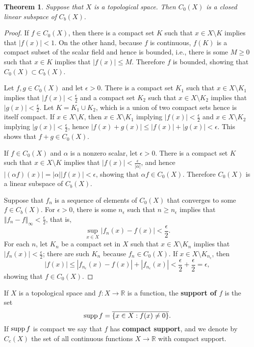 \documentclass{article}
\newcommand{\supp}{\ensuremath\mathrm{supp}\,}
\newcommand{\norm}[1]{\left\Vert #1 \right\Vert}
\newtheorem{theorem}{Theorem}
\theoremstyle{definition}
\begin{document}
\begin{theorem}
Suppose that $X$ is a topological space. Then $C_0(X)$ is a closed linear subspace of 
$C_b(X)$. 
\end{theorem}
\begin{proof}
If $f \in C_0(X)$, then there is a compact set $K$ such that $x \in X \setminus K$ implies
that $|f(x)|<1$. On the other hand, because $f$ is continuous, $f(K)$ is a compact subset of the scalar
field and hence is bounded, i.e., there is some $M \geq 0$ such that $x \in K$ implies that $|f(x)| \leq M$. Therefore
$f$ is bounded, showing that $C_0(X) \subset C_b(X)$.

Let $f,g \in C_0(X)$ and let $\epsilon>0$. There is a compact set $K_1$
such that $x \in X \setminus K_1$ implies that $|f(x)|<\frac{\epsilon}{2}$ and a compact set $K_2$
such that $x \in X \setminus K_2$ implies that $|g(x)|<\frac{\epsilon}{2}$.
Let $K=K_1 \cup K_2$, which is a union of two compact sets hence is itself compact. 
If $x \in X \setminus K$, then $x \in X \setminus K_1$ implying $|f(x)| < \frac{\epsilon}{2}$ and
$x \in X \setminus K_2$ implying $|g(x)|< \frac{\epsilon}{2}$, hence
$|f(x)+g(x)| \leq |f(x)|+|g(x)|<\epsilon$. This shows that $f+g \in C_0(X)$. 

If $f \in C_0(X)$ and $\alpha$ is a nonzero scalar, let $\epsilon>0$. There is a compact set
$K$ such that $x \in X \setminus K$ implies that $|f(x)|<\frac{\epsilon}{|\alpha|}$, and hence
$|(\alpha f)(x)| = |\alpha| |f(x)| < \epsilon$, showing that $\alpha f\in C_0(X)$.
Therefore $C_0(X)$ is a linear subspace of $C_b(X)$.

Suppose that $f_n$ is a sequence of elements of $C_0(X)$ that converges to some $f \in C_b(X)$.
For $\epsilon>0$, there is some $n_\epsilon$ such that $n \geq n_\epsilon$ implies that
$\norm{f_n-f}_\infty<\frac{\epsilon}{2}$, that is,
\[
\sup_{x \in X} |f_n(x)-f(x)|<\frac{\epsilon}{2}.
\]
For each $n$, let $K_n$ be a compact set in $X$ such that $x \in X \setminus K_n$ implies that
$|f_n(x)|<\frac{\epsilon}{2}$; there are such $K_n$ because   $f_n \in C_0(X)$. 
If $x \in X \setminus K_{n_\epsilon}$, then
\[
|f(x)|\leq |f_{n_\epsilon}(x)-f(x)| + |f_{n_\epsilon}(x)|
<\frac{\epsilon}{2}+\frac{\epsilon}{2}=\epsilon,
\]
showing that $f \in C_0(X)$. 
\end{proof}

If $X$ is a topological space and $f:X \to \mathbb{R}$ is a function, the \textbf{support of $f$} is the set
\[
\supp f = \overline{\{x \in X: f(x) \neq 0\}}.
\]
If $\supp f$ is compact we say that $f$ has \textbf{compact support}, and we denote by $C_c(X)$ the set of all
continuous functions $X \to \mathbb{R}$ with compact support.
\end{document}

